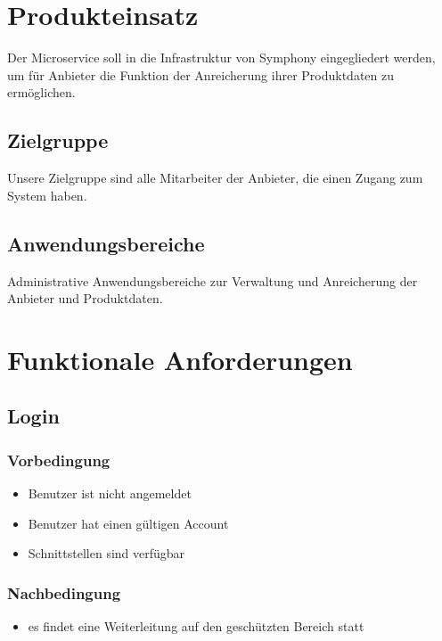 \documentclass[a4paper,12pt]{article}
\begin{document}
\section{Produkteinsatz}
Der Microservice soll in die Infrastruktur von Symphony eingegliedert werden, um für Anbieter die Funktion der Anreicherung ihrer Produktdaten zu ermöglichen.

\subsection{Zielgruppe}
Unsere Zielgruppe sind alle Mitarbeiter der Anbieter, die einen Zugang zum System haben.

\subsection{Anwendungsbereiche}
Administrative Anwendungsbereiche zur Verwaltung und Anreicherung der Anbieter und Produktdaten.

\section{Funktionale Anforderungen}
\subsection{Login}\label{login}

\subsubsection{Vorbedingung}\label{vorbedingung}

\begin{itemize}
\item
  Benutzer ist nicht angemeldet
\item
  Benutzer hat einen gültigen Account
\item
  Schnittstellen sind verfügbar
\end{itemize}

\subsubsection{Nachbedingung}\label{nachbedingung}

\begin{itemize}
\item
  es findet eine Weiterleitung auf den geschützten Bereich statt
\end{itemize}
\end{document}
